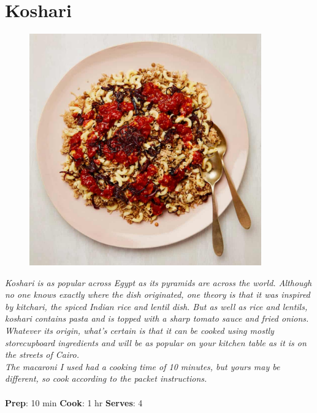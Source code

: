 \documentclass{book}
\begin{document}
\section{Koshari}
\begin{figure}
\centering\includegraphics[width=10cm,height=10cm,keepaspectratio]{Recipe_Pictures/Koshari.png}
\end{figure}
\emph{Koshari is as popular across Egypt as its pyramids are across the world. Although no one knows exactly where the dish originated, one theory is that it was inspired by kitchari, the spiced Indian rice and lentil dish. But as well as rice and lentils, koshari contains pasta and is topped with a sharp tomato sauce and fried onions. Whatever its origin, what’s certain is that it can be cooked using mostly storecupboard ingredients and will be as popular on your kitchen table as it is on the streets of Cairo.\\ 
The macaroni I used had a cooking time of 10 minutes, but yours may be different, so cook according to the packet instructions.}\\\\ 
\textbf{Prep}: 10 min
\textbf{Cook}: 1 hr
\textbf{Serves}: 4
\end{document}
